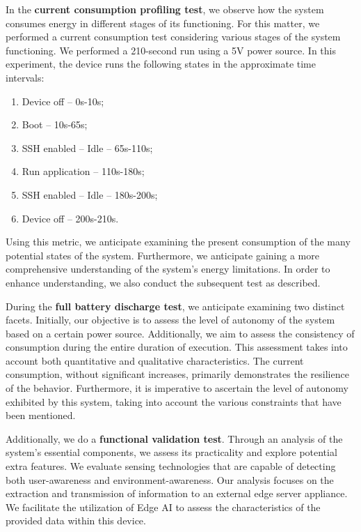In the \textbf{current consumption profiling test}, we observe how the system consumes energy in different stages of its functioning. For this matter, we performed a current consumption test considering various stages of the system functioning. We performed a 210-second run using a 5V power source. In this experiment, the device runs the following states in the approximate time intervals:

\begin{enumerate}
    \item Device off -- 0s-10s;
    \item Boot -- 10s-65s;
    \item SSH enabled -- Idle -- 65s-110s;
    \item Run application -- 110s-180s;
    \item SSH enabled -- Idle -- 180s-200s;
    \item Device off -- 200s-210s.
\end{enumerate}

Using this metric, we anticipate examining the present consumption of the many potential states of the system. Furthermore, we anticipate gaining a more comprehensive understanding of the system's energy limitations. In order to enhance understanding, we also conduct the subsequent test as described.

During the \textbf{full battery discharge test}, we anticipate examining two distinct facets. Initially, our objective is to assess the level of autonomy of the system based on a certain power source. Additionally, we aim to assess the consistency of consumption during the entire duration of execution. This assessment takes into account both quantitative and qualitative characteristics. The current consumption, without significant increases, primarily demonstrates the resilience of the behavior. Furthermore, it is imperative to ascertain the level of autonomy exhibited by this system, taking into account the various constraints that have been mentioned.

Additionally, we do a \textbf{functional validation test}. Through an analysis of the system's essential components, we assess its practicality and explore potential extra features. We evaluate sensing technologies that are capable of detecting both user-awareness and environment-awareness. Our analysis focuses on the extraction and transmission of information to an external edge server appliance. We facilitate the utilization of Edge AI to assess the characteristics of the provided data within this device.

